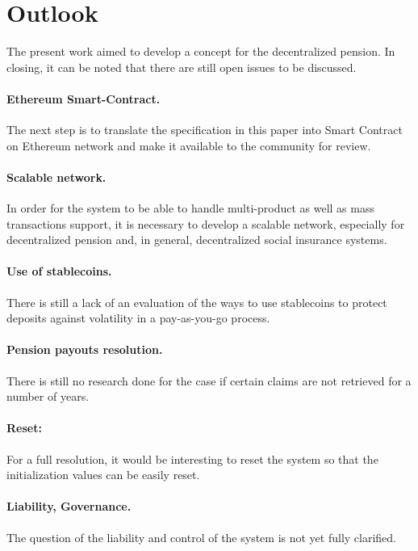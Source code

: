 \section{Outlook}


The present work aimed to develop a concept for the decentralized pension. In closing, it can be noted that there are still open issues to be discussed.


\paragraph{Ethereum Smart-Contract.} The next step is to translate the specification in this paper into Smart Contract on Ethereum network and make it available to the community for review.

\paragraph{Scalable network.} In order for the system to be able to handle multi-product as well as mass transactions support, it is necessary to develop a scalable network, especially for decentralized pension and, in general, decentralized social insurance systems.

\paragraph{Use of stablecoins.} There is still a lack of an evaluation of the ways to use stablecoins  to protect deposits against volatility in a pay-as-you-go process.

\paragraph{Pension payouts resolution.} There is still no research done for the case if certain claims are not retrieved for a number of years.

\paragraph{Reset:} For a full resolution, it would be interesting to reset the system so that the initialization values can be easily reset.

\paragraph{Liability, Governance.} The question of the liability and control of the system is not yet fully clarified.

